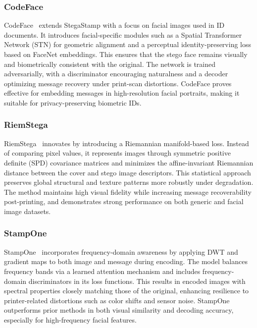 \subsubsection{CodeFace}
CodeFace~\cite{codeface2021} extends StegaStamp with a focus on facial images used in ID documents. It introduces facial-specific modules such as a Spatial Transformer Network (STN) for geometric alignment and a perceptual identity-preserving loss based on FaceNet embeddings. This ensures that the stego face remains visually and biometrically consistent with the original. The network is trained adversarially, with a discriminator encouraging naturalness and a decoder optimizing message recovery under print-scan distortions. CodeFace proves effective for embedding messages in high-resolution facial portraits, making it suitable for privacy-preserving biometric IDs.

\subsubsection{RiemStega}
RiemStega~\cite{cruz2025riemstega} innovates by introducing a Riemannian manifold-based loss. Instead of comparing pixel values, it represents images through symmetric positive definite (SPD) covariance matrices and minimizes the affine-invariant Riemannian distance between the cover and stego image descriptors. This statistical approach preserves global structural and texture patterns more robustly under degradation. The method maintains high visual fidelity while increasing message recoverability post-printing, and demonstrates strong performance on both generic and facial image datasets.

\subsubsection{StampOne}
StampOne~\cite{stampone2024} incorporates frequency-domain awareness by applying DWT and gradient maps to both image and message during encoding. The model balances frequency bands via a learned attention mechanism and includes frequency-domain discriminators in its loss functions. This results in encoded images with spectral properties closely matching those of the original, enhancing resilience to printer-related distortions such as color shifts and sensor noise. StampOne outperforms prior methods in both visual similarity and decoding accuracy, especially for high-frequency facial features.